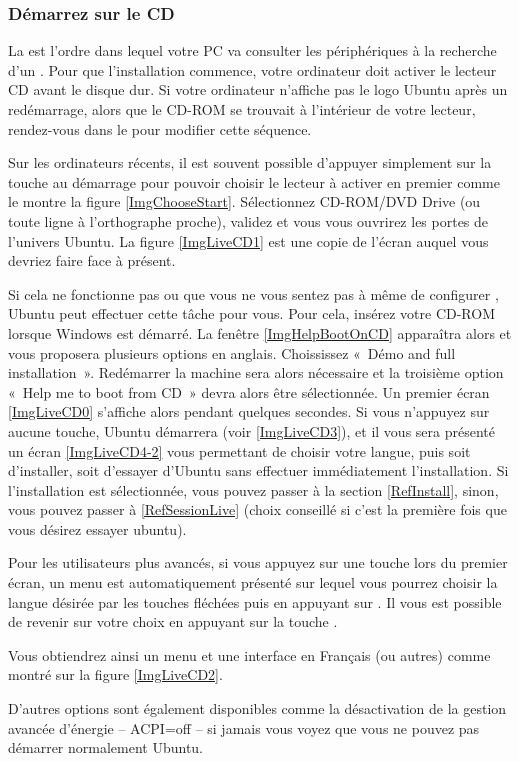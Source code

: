 \subsubsection{Démarrez sur le CD}
La  est l'ordre dans lequel votre PC va consulter les périphériques à la recherche d'un . Pour que l'installation commence, votre ordinateur doit activer le lecteur CD avant le disque dur. Si votre ordinateur n'affiche pas le logo Ubuntu après un redémarrage, alors que le CD-ROM se trouvait à l'intérieur de votre lecteur, rendez-vous dans le   pour modifier cette séquence.\par
{}
Sur les ordinateurs récents, il est souvent possible d'appuyer simplement sur la touche  au démarrage pour pouvoir choisir le lecteur à activer en premier comme le montre la figure \ref{ImgChooseStart}. Sélectionnez CD-ROM/DVD Drive (ou toute ligne à l'orthographe proche), validez et vous vous ouvrirez les portes de l'univers Ubuntu. La figure \ref{ImgLiveCD1} est une copie de l'écran auquel vous devriez faire face à présent.\par
Si cela ne fonctionne pas ou que vous ne vous sentez pas à même de configurer , Ubuntu peut effectuer cette tâche pour vous. Pour cela, insérez votre CD-ROM lorsque Windows est démarré. La fenêtre \ref{ImgHelpBootOnCD} apparaîtra alors et vous proposera plusieurs options en anglais. Choississez «~Démo and full installation~». Redémarrer la machine sera alors nécessaire et la troisième option «~Help me to boot from CD~» devra alors être sélectionnée.
Un premier écran \ref{ImgLiveCD0} s'affiche alors pendant quelques secondes. Si vous n'appuyez sur aucune touche, Ubuntu démarrera (voir \ref{ImgLiveCD3}), et il vous sera présenté un écran \ref{ImgLiveCD4-2} vous permettant de choisir votre langue, puis soit d'installer, soit d'essayer d'Ubuntu sans effectuer immédiatement l'installation. Si l'installation est sélectionnée, vous pouvez passer à la section \ref{RefInstall}, sinon, vous pouvez passer à \ref{RefSessionLive} (choix conseillé si c'est la première fois que vous désirez essayer ubuntu).\par
\ChoixDebutLive
Pour les utilisateurs plus avancés, si vous appuyez sur une touche lors du premier écran, un menu est automatiquement présenté sur lequel vous pourrez choisir la langue désirée par les touches fléchées puis en appuyant sur . Il vous est possible de revenir sur votre choix en appuyant sur la touche .\par
Vous obtiendrez ainsi un menu et une interface en Français (ou autres) comme montré sur la figure \ref{ImgLiveCD2}.\par
D'autres options sont également disponibles comme la désactivation de la gestion avancée d'énergie -- ACPI=off -- si jamais vous voyez que vous ne pouvez pas démarrer normalement Ubuntu.
\ChoixDebutInstall
